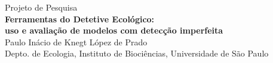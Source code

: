 \documentclass[12pt, A4]{article}
\begin{document}
\pagestyle{fancyplain}
\rhead[\fancyplain{}{\textsl{\thepage}}]%
      {\fancyplain{}{\textsl{\thepage}}}
\lfoot[]{}
\cfoot[]{}
\thispagestyle{empty}
\begin{center}
	{\large Projeto de Pesquisa}	\\\vspace{0.5\baselineskip}
	\textbf{\Large Ferramentas do Detetive Ecológico: \\\vspace{.25\baselineskip}
          uso e avaliação de modelos com detecção imperfeita} \\\vspace{1.5\baselineskip}
	{\normalsize Paulo Inácio de Knegt López de Prado } \\\vspace{.5\baselineskip}
        {\normalsize Depto. de Ecologia, Instituto de Biociências, Universidade de São Paulo}	%
\end{center}
\end{document}

